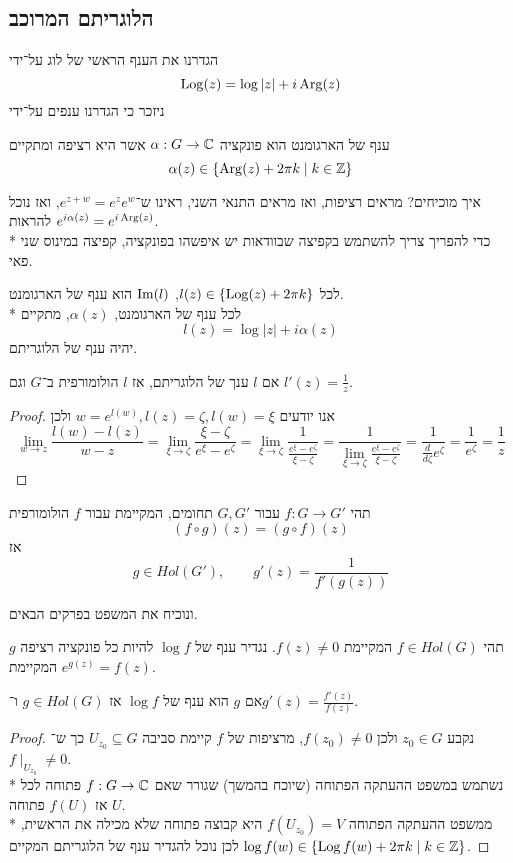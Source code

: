 \subsection{הלוגריתם המרוכב}
הגדרנו את הענף הראשי של לוג על־ידי
\[
	\operatorname{Log}(z) = \log |z| + i \operatorname{Arg}(z)
\]
ניזכר כי הגדרנו ענפים על־ידי
\begin{definition}
	ענף של הארגומנט הוא פונקציה $\alpha : G \to \mathbb{C}$ אשר היא רציפה ומתקיים
	\[
		\alpha(z) \in \{ \operatorname{Arg}(z) + 2\pi k \mid k \in \mathbb{Z} \}
	\]
\end{definition}
איך מוכיחים? מראים רציפות, ואז מראים התנאי השני, ראינו ש־$e^{z + w} = e^z e^w$, ואז נוכל להראות $e^{i\alpha(z)} = e^{i\operatorname{Arg}(z)}$. \\*
כדי להפריך צריך להשתמש בקפיצה שבוודאות יש איפשהו בפונקציה, קפיצה במינוס שני פאי.
\begin{remark}
	לכל $l(z) \in \{ \operatorname{Log}(z) + 2\pi k \}$, $\operatorname{Im}(l)$ הוא ענף של הארגומנט. \\*
	לכל ענף של הארגומנט, $\alpha(z)$, מתקיים
	\[
		l(z) = \log|z| + i \alpha(z)
	\]
	יהיה ענף של הלוגריתם.
\end{remark}
\begin{proposition}
	אם $l$ ענך של הלוגריתם, אז $l$ הולומורפית ב־$G$ וגם $l'(z) = \frac{1}{z}$.
\end{proposition}
\begin{proof}
	אנו יודעים $w = e^{l(w)}, l(z) = \zeta, l(w) = \xi$ ולכן
	\[
		\lim_{w \to z} \frac{l(w) - l(z)}{w - z}
		= \lim_{\xi \to \zeta} \frac{\xi - \zeta}{e^\xi - e^\zeta}
		= \lim_{\xi \to \zeta} \frac{1}{\frac{e^\xi - e^\zeta}{\xi - \zeta}}
		= \frac{1}{\lim_{\xi \to \zeta} \frac{e^\xi - e^\zeta}{\xi - \zeta}}
		= \frac{1}{\frac{d}{d\zeta} e^\zeta}
		= \frac{1}{e^\zeta}
		= \frac{1}{z}
	\]
\end{proof}
\begin{theorem}
	תהי $f : G \to G'$ עבור $G, G'$ תחומים, המקיימת עבור $f$ הולומורפית
	\[
		(f \circ g)(z) = (g \circ f)(z)
	\]
	אז
	\[
		g \in Hol(G'),
		\qquad
		g'(z) = \frac{1}{f'(g(z))}
	\]
\end{theorem}
ונוכיח את המשפט בפרקים הבאים.
\begin{definition}
	תהי $f \in Hol(G)$ המקיימת $f(z) \ne 0$.
	נגדיר ענף של $\log f$ להיות כל פונקציה רציפה $g$ המקיימת $e^{g(z)} = f(z)$.
\end{definition}
\begin{proposition}
	אם $g$ הוא ענף של $\log f$ אז $g \in Hol(G)$ ו־$g'(z) = \frac{f'(z)}{f(z)}$.
\end{proposition}
\begin{proof}
	נקבע $z_0 \in G$ ולכן $f(z_0) \ne 0$, מרציפות של $f$ קיימת סביבה $U_{z_0} \subseteq G$ כך ש־$f \mid_{U_{z_0}} \ne 0$. \\*
	נשתמש במשפט ההעתקה הפתוחה (שיוכח בהמשך) שגורר שאם $f : G \to \mathbb{C}$ פתוחה לכל $U$ אז $f(U)$ פתוחה. \\*
	ממשפט ההעתקה הפתוחה $f(U_{z_0}) = V$ היא קבוצה פתוחה שלא מכילה את הראשית,
	לכן נוכל להגדיר ענף של הלוגריתם המקיים $\log f(w) \in \{ \operatorname{Log} f(w) + 2\pi k \mid k \in \mathbb{Z} \}$.
\end{proof}
